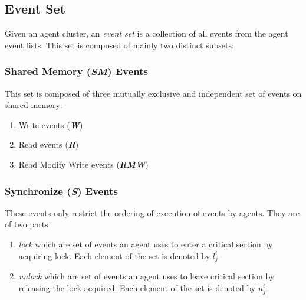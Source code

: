     
    \newcommand{\rmw}{\textit{rmw}\,}
    \newcommand{\set}[1]{\textbf{\textit{#1}}}

    \subsection{Event Set}
    Given an agent cluster, an \textit{event set} is a collection of all events from the agent event lists. This set is composed of mainly two distinct subsets:
       
        \subsubsection{Shared Memory (\set{SM}) Events} This set is composed of three mutually exclusive and independent set of events on shared memory: 
            \begin{enumerate}
                \item Write events (\set{W})
                \item Read events (\set{R}) 
                \item Read Modify Write events (\set{RMW}) 
            \end{enumerate}
        
        \subsubsection{Synchronize (\set{S}) Events} These events only restrict the ordering of execution of events by agents. They are of two parts
            \begin{enumerate}
                \item \textit{lock} which are set of events an agent uses to enter a critical section by acquiring lock. Each element of the set is denoted by $l^i_j$
                \item \textit{unlock}  which are set of events an agent uses to leave critical section by releasing the lock acquired. Each element of the set is denoted by $u^i_j$
            \end{enumerate}
            
 

